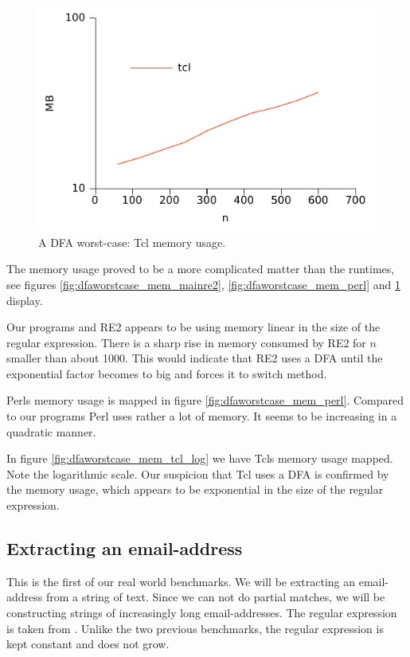 \begin{figure}
\centering
\includegraphics{benchmarks/memory/dfaworstcase_tcl_log.pdf}
\caption{A DFA worst-case: Tcl memory usage.}
\label{fig:dfaworstcase_mem_tcl_log}
\end{figure}

The memory usage proved to be a more complicated matter than the
runtimes, see figures \ref{fig:dfaworstcase_mem_mainre2},
\ref{fig:dfaworstcase_mem_perl} and \ref{fig:dfaworstcase_mem_tcl_log}
display.

Our programs and RE2 appears to be using memory linear in the size of
the regular expression. There is a sharp rise in memory consumed by
RE2 for $n$ smaller than about 1000. This would indicate that RE2 uses
a DFA until the exponential factor becomes to big and forces it to
switch method. 

Perls memory usage is mapped in figure
\vref{fig:dfaworstcase_mem_perl}. Compared to our programs Perl uses
rather a lot of memory. It seems to be increasing in a quadratic
manner.

In figure \vref{fig:dfaworstcase_mem_tcl_log} we have Tcls memory
usage mapped. Note the logarithmic scale. Our suspicion that Tcl uses
a DFA is confirmed by the memory usage, which appears to be
exponential in the size of the regular expression. 


\subsection{Extracting an email-address}

This is the first of our real world benchmarks. We will be extracting
an email-address from a string of text. Since we can not do partial
matches, we will be constructing strings of increasingly long
email-addresses. The regular expression is taken from
\cite{veanes}. Unlike the two previous benchmarks, the regular
expression is kept constant and does not grow.

